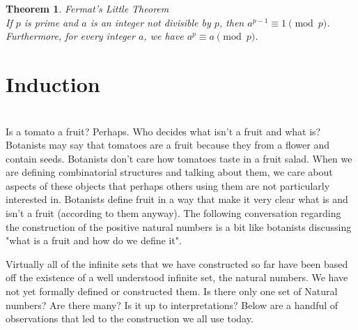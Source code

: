 \documentclass[letterpaper,10pt]{article}
\theoremstyle{plain}
\newtheorem{thm}{Theorem}[section]
\theoremstyle{definition}
\theoremstyle{remark}
\begin{document}
\begin{thm}{Fermat's Little Theorem}$ $\\

If $p$ is prime and $a$ is an integer not divisible by $p$, then $a^{p-1} \equiv 1 \pmod{p}$. Furthermore, for every integer $a$, we have $a^p \equiv a \pmod{p}$.

\end{thm}
\newpage

\section{Induction} $ $\\

Is a tomato a fruit? Perhaps.
\newline
Who decides what isn't a fruit and what is? Botanists may say that tomatoes are a fruit because they from a flower and contain seeds. Botanists don't care how tomatoes taste in a fruit salad. 
\newline
When we are defining combinatorial structures and talking about them, we care about aspects of these objects that perhaps others using them are not particularly interested in. Botanists define fruit in a way that make it very clear what is and isn't a fruit (according to them anyway).
\newline
The following conversation regarding the construction of the positive natural numbers is a bit like botanists discussing "what is a fruit and how do we define it".
\newline

Virtually all of the infinite sets that we have constructed so far have been based off the existence of a well understood infinite set, the natural numbers. We have not yet formally defined or constructed them. Is there only one set of Natural numbers? Are there many? Is it up to interpretations? Below are a handful of observations that led to the construction we all use today.
\newline
\end{document}
